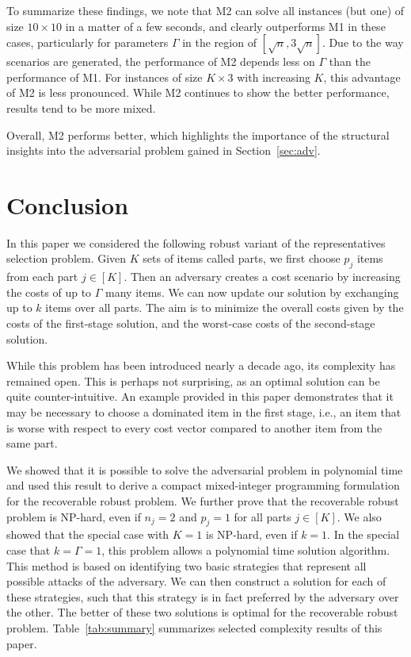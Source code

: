 To summarize these findings, we note that M2 can solve all instances (but one) of size $10\times 10$ in a matter of a few seconds, and clearly outperforms M1 in these cases, particularly for parameters $\Gamma$ in the region of $[\sqrt{n},3\sqrt{n}]$. Due to the way scenarios are generated, the performance of M2 depends less on $\Gamma$ than the performance of M1. For instances of size $K \times 3$ with increasing $K$, this advantage of M2 is less pronounced. While M2 continues to show the better performance, results tend to be more mixed.

Overall, M2 performs better, which highlights the importance of the structural insights into the adversarial problem gained in Section~\ref{sec:adv}.

\section{Conclusion}
\label{sec:conclusions}

In this paper we considered the following robust variant of the representatives selection problem. Given $K$ sets of items called parts, we first choose $p_j$ items from each part $j\in[K]$. Then an adversary creates a cost scenario by increasing the costs of up to $\Gamma$ many items. We can now update our solution by exchanging up to $k$ items over all parts. The aim is to minimize the overall costs given by the costs of the first-stage solution, and the worst-case costs of the second-stage solution.

While this problem has been introduced nearly a decade ago, its complexity has remained open. This is perhaps not surprising, as an optimal solution can be quite counter-intuitive. An example provided in this paper demonstrates that it may be necessary to choose a dominated item in the first stage, i.e., an item that is worse with respect to every cost vector compared to another item from the same part.

We showed that it is possible to solve the adversarial problem in polynomial time and used this result to derive a compact mixed-integer programming formulation for the recoverable robust problem. We further prove that the recoverable robust problem is NP-hard, even if $n_j=2$ and $p_j=1$ for all parts $j\in[K]$. We also showed that the special case with $K=1$ is NP-hard, even if $k=1$. In the special case that $k=\Gamma=1$, this problem allows a polynomial time solution algorithm. This method is based on identifying two basic strategies that represent all possible attacks of the adversary. We can then construct a solution for each of these strategies, such that this strategy is in fact preferred by the adversary over the other. The better of these two solutions is optimal for the recoverable robust problem. Table~\ref{tab:summary} summarizes selected complexity results of this paper.

